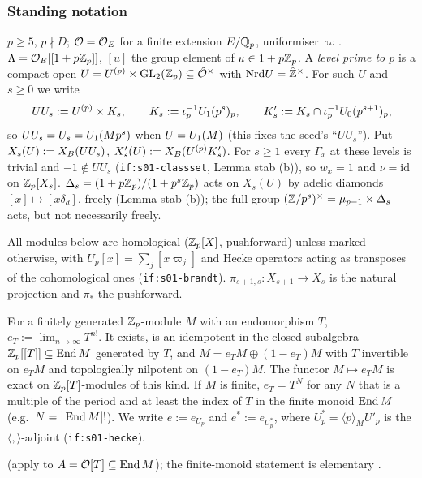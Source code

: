 \subsubsection{Standing notation}\label{ss:s04-notation}
$p\ge5$, $p\nmid D$; $\mathcal{O}=\mathcal{O}_E$ for a finite extension $E/\mathbb{Q}_p$, uniformiser $\varpi$. $\Lambda=\mathcal{O}_E[[1+p\mathbb{Z}_p]]$, $[u]$ the group
element of $u\in1+p\mathbb{Z}_p$. A \emph{level prime to $p$} is a compact open $U=U^{(p)}\times\mathrm{GL}_2(\mathbb{Z}_p)\subseteq\hat{\mathcal{O}}^\times$ with
$\mathrm{Nrd} U=\hat{\mathbb{Z}}^\times$. For such $U$ and $s\ge0$ we write
\[UU_s:=U^{(p)}\times K_{s},\qquad K_{s}:=\iota_p^{-1}U_1(p^s)_p,\qquad K'_{s}:=K_{s}\cap\iota_p^{-1}U_0(p^{s+1})_p ,\]
so $UU_s=U_s=U_1(Mp^s)$ when $U=U_1(M)$ (this fixes the seed's ``$UU_s$''). Put $X_s(U):=X_B(UU_s)$, $X'_s(U):=X_B(U^{(p)}K'_{s})$.
For $s\ge1$ every $\Gamma_x$ at these levels is trivial and $-1\notin UU_s$ (\texttt{if:s01-classset}, Lemma stab (b)), so
$w_x=1$ and $\nu=\mathrm{id}$ on $\mathbb{Z}_p[X_s]$. $\Delta_s=(1+p\mathbb{Z}_p)/(1+p^s\mathbb{Z}_p)$ acts on $X_s(U)$ by adelic diamonds $[x]\mapsto[x\delta_d]$,
freely (Lemma stab (b)); the full group $(\mathbb{Z}/p^s)^\times=\mu_{p-1}\times\Delta_s$ acts, but not necessarily freely.

All modules below are homological ($\mathbb{Z}_p[X]$, pushforward) unless marked otherwise, with $U_p[x]=\sum_j[x\varpi_j]$ and Hecke
operators acting as transposes of the cohomological ones (\texttt{if:s01-brandt}). $\pi_{s+1,s}:X_{s+1}\to X_s$ is the natural
projection and $\pi_*$ the pushforward.

\begin{definition}\label{def:s04-e}
For a finitely generated $\mathbb{Z}_p$-module $M$ with an endomorphism $T$, $e_T:=\lim_{n\to\infty}T^{n!}$. It exists, is an idempotent
in the closed subalgebra $\mathbb{Z}_p[[T]]\subseteq\operatorname{End} M$ generated by $T$, and $M=e_TM\oplus(1-e_T)M$ with $T$ invertible on $e_TM$ and
topologically nilpotent on $(1-e_T)M$. The functor $M\mapsto e_TM$ is exact on $\mathbb{Z}_p[T]$-modules of this kind. If $M$ is finite,
$e_T=T^{N}$ for any $N$ that is a multiple of the period and at least the index of $T$ in the finite monoid $\operatorname{End} M$
(e.g.\ $N=|\operatorname{End} M|!$). We write $e:=e_{U_p}$ and $e^*:=e_{U_p^*}$, where $U_p^*=\langle p\rangle_MU'_p$ is the
$\langle,\rangle$-adjoint (\texttt{if:s01-hecke}).
\end{definition}
\noindent\stknown{}  (apply to $A=\mathcal{O}[T]\subseteq\operatorname{End} M$);
the finite-monoid statement is elementary \sttoprove.

